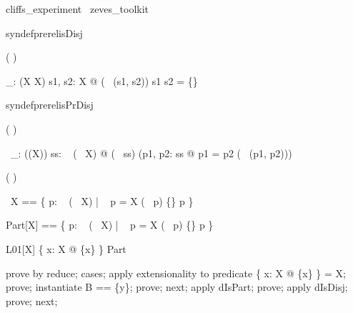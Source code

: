 
\begin{zsection}
   \SECTION cliffs\_experiment \parents~zeves\_toolkit
\end{zsection}

syndef{\isDisj}{prerel}{isDisj}
\begin{zed}
  \relation ( \isDisj \varg )
\end{zed}

\begin{gendef}[X]
  \isDisj\_: \power  (\power  X \cross  \power  X)
\where
    \forall  s1, s2: \power  X @ (\isDisj~ (s1, s2)) \iff  s1 \cap  s2 = \{\}
\end{gendef}

syndef{\isPrDisj}{prerel}{isPrDisj}
\begin{zed}
  \relation ( \isPrDisj \varg )
\end{zed}

\begin{gendef}[X]
  \isPrDisj~\_: \power  (\power  (\power  X))
\where
    \forall  ss: \power~  (\power~  X) @ (\isPrDisj~ ss) \iff  (\forall  p1, p2: ss @ p1 = p2 \lor  (\isDisj~ (p1, p2)))
\end{gendef}

\begin{zed}
  \generic ( \PartNo \varg )
\end{zed}

\begin{zed}
 \PartNo~X == \{  p: \power~  (\power~  X) | \bigcup~ p = X \land  (\isPrDisj~ p) \land  \{\} \notin  p \}
\end{zed}

\begin{zed}
Part[X] == \{  p: \power~  (\power~  X) | \bigcup~ p = X \land  (\isPrDisj~ p) \land  \{\} \notin  p \}
\end{zed}

\begin{theorem}{L01}[X]
\{  x: X @ \{x\} \} \in  Part
\end{theorem}

\begin{zproof}[L01]
prove by reduce;
cases;
apply extensionality to predicate \bigcup [X] \{  x: X @ \{x\} \} = X;
prove;
instantiate B == \{y\};
prove;
next;
apply dIsPart;
prove;
apply dIsDisj;
prove;
next;
\end{zproof}

